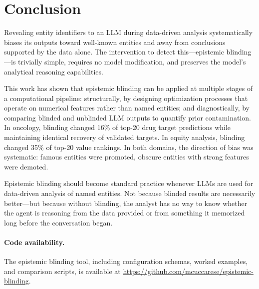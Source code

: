 \documentclass[sigconf, nonacm]{acmart}
\begin{document}
\section{Conclusion}

Revealing entity identifiers to an LLM during data-driven analysis systematically biases its outputs toward well-known entities and away from conclusions supported by the data alone. The intervention to detect this---epistemic blinding---is trivially simple, requires no model modification, and preserves the model's analytical reasoning capabilities.

This work has shown that epistemic blinding can be applied at multiple stages of a computational pipeline: structurally, by designing optimization processes that operate on numerical features rather than named entities; and diagnostically, by comparing blinded and unblinded LLM outputs to quantify prior contamination. In oncology, blinding changed 16\% of top-20 drug target predictions while maintaining identical recovery of validated targets. In equity analysis, blinding changed 35\% of top-20 value rankings. In both domains, the direction of bias was systematic: famous entities were promoted, obscure entities with strong features were demoted.

Epistemic blinding should become standard practice whenever LLMs are used for data-driven analysis of named entities. Not because blinded results are necessarily better---but because without blinding, the analyst has no way to know whether the agent is reasoning from the data provided or from something it memorized long before the conversation began.

\paragraph{Code availability.} The epistemic blinding tool, including configuration schemas, worked examples, and comparison scripts, is available at \url{https://github.com/mcuccarese/epistemic-blinding}.
\end{document}
